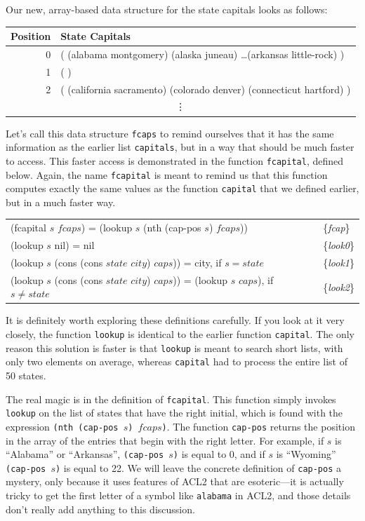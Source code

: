 Our new, array-based data structure for the state capitals 
looks as follows:
\begin{center}
\begin{tabular}{r|l}
Position & State Capitals \\
\hline
0 & ( (alabama  montgomery) (alaska   juneau) %
    \dots (arkansas  little-rock) ) \\
1 & ( ) \\
2 & ( (california  sacramento) (colorado  denver) (connecticut  hartford) ) \\
\multicolumn{2}{c}{\vdots} \\
\end{tabular}
\end{center}
Let's call this data structure \texttt{fcaps} to remind ourselves that
it has the same information as the earlier list \texttt{capitals}, but
in a way that should be much faster to access. This faster access is
demonstrated in the function \texttt{fcapital}, defined below. Again,
the name \texttt{fcapital} is meant to remind us that this function
computes exactly the same values as the function \texttt{capital} that
we defined earlier, but in a much faster way.
\begin{center}
\begin{tabular}{ll}
(fcapital $s$ $fcaps$) = (lookup $s$ (nth (cap-pos $s$) $fcaps$)) & \{\emph{fcap}\} \\
(lookup $s$ nil) = nil  & \{\emph{look0}\}     \\
(lookup $s$ (cons (cons $state$ $city$) $caps$)) = city, if $s = state$ & \{\emph{look1}\} \\
(lookup $s$ (cons (cons $state$ $city$) $caps$)) = (lookup $s$ $caps$), if $s \ne state$ & \{\emph{look2}\} \\
\end{tabular}
\end{center}
It is definitely worth exploring these definitions carefully.
If you look at it very closely, the function \texttt{lookup} is
identical to the earlier function \texttt{capital}.
The only reason this solution is faster is that \texttt{lookup} 
is meant to search short lists, with only two elements on average, 
whereas \texttt{capital} had to process the entire list of 50 states.

The real magic is in the definition of \texttt{fcapital}. This
function simply invokes \texttt{lookup} on the list of states that
have the right initial, which is found with the expression
\texttt{(nth (cap-pos $s$) $fcaps$)}. The function \texttt{cap-pos}
returns the position in the array of the entries that begin with
the right letter. For example, if $s$ is ``Alabama'' or ``Arkansas'', 
\texttt{(cap-pos $s$)} is equal to 0, and if $s$ is ``Wyoming''
\texttt{(cap-pos $s$)} is equal to 22. We will leave the concrete
definition of \texttt{cap-pos} a mystery, only because it uses
features of ACL2 that are esoteric---it is actually tricky to get
the first letter of a symbol like \texttt{alabama} in ACL2, and
those details don't really add anything to this discussion.

